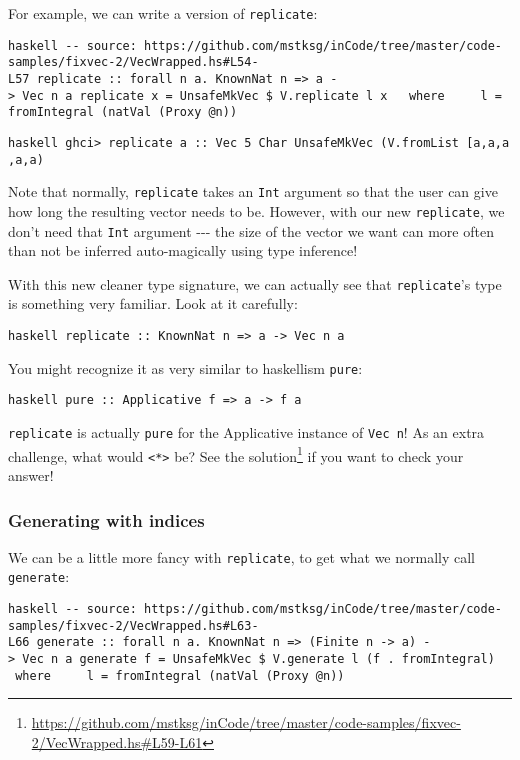 \documentclass[]{article}
\renewcommand{\href}[2]{#2\footnote{\url{#1}}}
\begin{document}
For example, we can write a version of \texttt{replicate}:

\texttt{haskell\ -\/-\ source:\ https://github.com/mstksg/inCode/tree/master/code-samples/fixvec-2/VecWrapped.hs\#L54-L57\ replicate\ ::\ forall\ n\ a.\ KnownNat\ n\ =\textgreater{}\ a\ -\textgreater{}\ Vec\ n\ a\ replicate\ x\ =\ UnsafeMkVec\ \$\ V.replicate\ l\ x\ \ \ where\ \ \ \ \ l\ =\ fromIntegral\ (natVal\ (Proxy\ @n))}

\texttt{haskell\ ghci\textgreater{}\ replicate\ \textquotesingle{}a\textquotesingle{}\ ::\ Vec\ 5\ Char\ UnsafeMkVec\ (V.fromList\ {[}\textquotesingle{}a\textquotesingle{},\textquotesingle{}a\textquotesingle{},\textquotesingle{}a\textquotesingle{},\textquotesingle{}a\textquotesingle{},\textquotesingle{}a\textquotesingle{}{]})}

Note that normally, \texttt{replicate} takes an \texttt{Int} argument so that
the user can give how long the resulting vector needs to be. However, with our
new \texttt{replicate}, we don't need that \texttt{Int} argument -\/-\/- the
size of the vector we want can more often than not be inferred auto-magically
using type inference!

With this new cleaner type signature, we can actually see that
\texttt{replicate}'s type is something very familiar. Look at it carefully:

\texttt{haskell\ replicate\ ::\ KnownNat\ n\ =\textgreater{}\ a\ -\textgreater{}\ Vec\ n\ a}

You might recognize it as very similar to haskellism \texttt{pure}:

\texttt{haskell\ pure\ ::\ Applicative\ f\ =\textgreater{}\ a\ -\textgreater{}\ f\ a}

\texttt{replicate} is actually \texttt{pure} for the Applicative instance of
\texttt{Vec\ n}! As an extra challenge, what would
\texttt{\textless{}*\textgreater{}} be? See
\href{https://github.com/mstksg/inCode/tree/master/code-samples/fixvec-2/VecWrapped.hs\#L59-L61}{the
solution} if you want to check your answer!

\subsubsection{Generating with indices}

We can be a little more fancy with \texttt{replicate}, to get what we normally
call \texttt{generate}:

\texttt{haskell\ -\/-\ source:\ https://github.com/mstksg/inCode/tree/master/code-samples/fixvec-2/VecWrapped.hs\#L63-L66\ generate\ ::\ forall\ n\ a.\ KnownNat\ n\ =\textgreater{}\ (Finite\ n\ -\textgreater{}\ a)\ -\textgreater{}\ Vec\ n\ a\ generate\ f\ =\ UnsafeMkVec\ \$\ V.generate\ l\ (f\ .\ fromIntegral)\ \ \ where\ \ \ \ \ l\ =\ fromIntegral\ (natVal\ (Proxy\ @n))}
\end{document}
